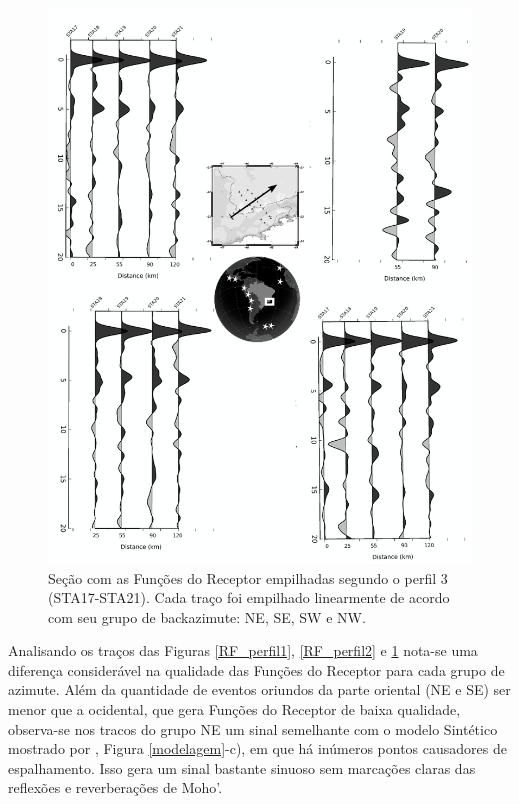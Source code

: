 \begin{figure}[!ht]
\centering
\includegraphics[scale=0.15]{Figs/RF_azimute_perfil3.png}
\caption{Seção com as Funções do Receptor empilhadas segundo o perfil 3 (STA17-STA21). Cada traço foi empilhado linearmente de acordo com seu grupo de backazimute: NE, SE, SW e NW.}
\label{RF_perfil3}
\end{figure}

Analisando os traços das Figuras \ref{RF_perfil1}, \ref{RF_perfil2} e \ref{RF_perfil3} nota-se uma diferença considerável na qualidade das Funções do Receptor para cada grupo de azimute. Além da quantidade de eventos oriundos da parte oriental (NE e SE) ser menor que a ocidental, que gera Funções do Receptor de baixa qualidade, observa-se nos tracos do grupo NE um sinal semelhante com o modelo Sintético mostrado por \cite{sand_franca_crustal_2004}, Figura \ref{modelagem}-c), em que há inúmeros pontos causadores de espalhamento. Isso gera um sinal bastante sinuoso sem marcações claras das reflexões e reverberações de Moho'.

